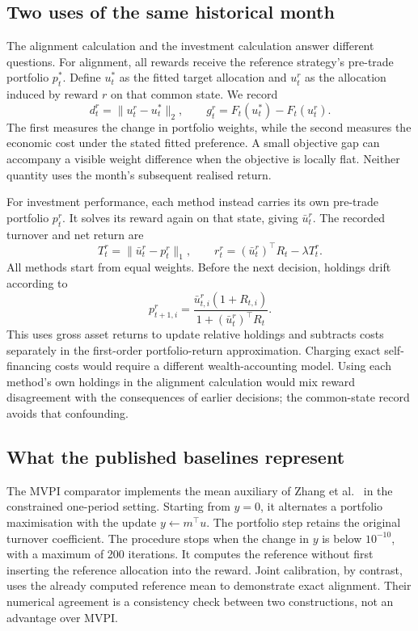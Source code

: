 \documentclass[sigconf,anonymous,review]{acmart}
\begin{document}
\subsection{Two uses of the same historical month}
The alignment calculation and the investment calculation answer different questions. For alignment, all rewards receive the reference strategy's pre-trade portfolio $p_t^*$. Define $u_t^*$ as the fitted target allocation and $u_t^r$ as the allocation induced by reward $r$ on that common state. We record
\begin{equation}
 d_t^r=\|u_t^r-u_t^*\|_2,\qquad
 g_t^r=F_t(u_t^*)-F_t(u_t^r).
\end{equation}
The first measures the change in portfolio weights, while the second measures the economic cost under the stated fitted preference. A small objective gap can accompany a visible weight difference when the objective is locally flat. Neither quantity uses the month's subsequent realised return.

For investment performance, each method instead carries its own pre-trade portfolio $p_t^r$. It solves its reward again on that state, giving $\bar u_t^r$. The recorded turnover and net return are
\begin{equation}
 T_t^r=\|\bar u_t^r-p_t^r\|_1,\qquad
 r_t^r=(\bar u_t^r)^\top R_t-\lambda T_t^r.
\end{equation}
All methods start from equal weights. Before the next decision, holdings drift according to
\begin{equation}
 p_{t+1,i}^r=
 \frac{\bar u_{t,i}^r(1+R_{t,i})}{1+(\bar u_t^r)^\top R_t}.
\end{equation}
This uses gross asset returns to update relative holdings and subtracts costs separately in the first-order portfolio-return approximation. Charging exact self-financing costs would require a different wealth-accounting model. Using each method's own holdings in the alignment calculation would mix reward disagreement with the consequences of earlier decisions; the common-state record avoids that confounding.

\subsection{What the published baselines represent}
The MVPI comparator implements the mean auxiliary of Zhang et al.\ \cite{zhang2021} in the constrained one-period setting. Starting from $y=0$, it alternates a portfolio maximisation with the update $y\leftarrow m^\top u$. The portfolio step retains the original turnover coefficient. The procedure stops when the change in $y$ is below $10^{-10}$, with a maximum of 200 iterations. It computes the reference without first inserting the reference allocation into the reward. Joint calibration, by contrast, uses the already computed reference mean to demonstrate exact alignment. Their numerical agreement is a consistency check between two constructions, not an advantage over MVPI.
\end{document}
